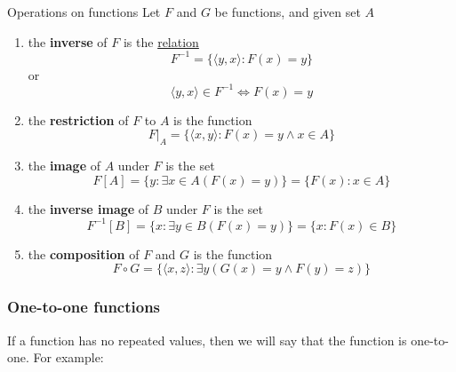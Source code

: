 \begin{definition}{Operations on functions}{}
    Let $F$ and $G$ be functions, and given set $A$
    \begin{enumerate}

        \item the \textbf{inverse} of $F$ is the \underline{relation} 
        \begin{equation*}
            F^{-1} = \{\langle y,x \rangle : F(x) = y\}
        \end{equation*}
        or
        \begin{equation*}
            \langle y,x \rangle \in F^{-1} \iff F(x) = y
        \end{equation*}
        \item the \textbf{restriction} of $F$ to $A$ is the function
        \begin{equation*}
            F \vert_{A} = \{\langle x,y \rangle : F(x) = y \land x \in A\}
        \end{equation*}
        \item the \textbf{image} of $A$ under $F$ is the set
        \begin{equation*}
            F[A] = \{y : \exists x \in A (F(x) = y)\} = \{F(x): x \in A\}
        \end{equation*}
        \item the \textbf{inverse image} of $B$ under $F$ is the set
        \begin{equation*}
            F^{-1}[B] = \{x : \exists y \in B(F(x) = y)\} = \{x : F(x) \in B\}
        \end{equation*}
        \item the \textbf{composition} of $F$ and $G$ is the function
        \begin{equation*}
            F \circ G = \{\langle x,z \rangle : \exists y (G(x)=y \land F(y)=z)\}
        \end{equation*}
    \end{enumerate}
\end{definition}

\subsubsection{One-to-one functions}
If a function has no repeated values, then we will say that the function is one-to-one.
For example:

